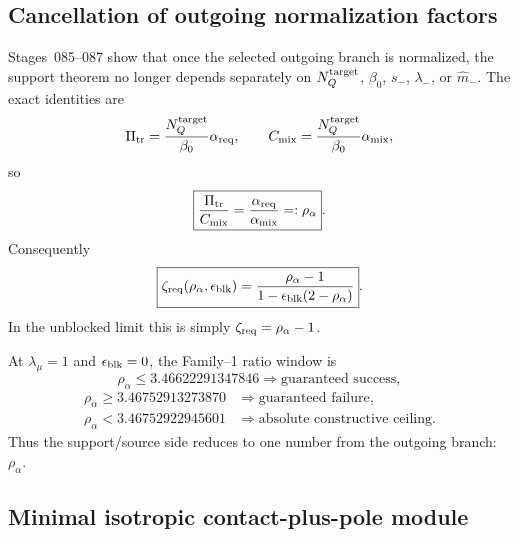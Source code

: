 \subsection{Cancellation of outgoing normalization factors}
\label{subsec:part03-normalization-cancellation}

Stages~085--087 show that once the selected outgoing branch is normalized, the support theorem no longer depends separately on \(N_Q^{\rm target}\), \(\beta_0\), \(s_-\), \(\lambda_-\), or \(\widehat m_-\).  The exact identities are
\begin{equation}
\label{eq:part03-Pi-Cmix-alpha}
\Pi_{\rm tr}=\frac{N_Q^{\rm target}}{\beta_0}\alpha_{\rm req},
\qquad
C_{\rm mix}=\frac{N_Q^{\rm target}}{\beta_0}\alpha_{\rm mix},
\end{equation}
so
\begin{equation}
\label{eq:part03-rhoalpha-def}
\boxed{
\frac{\Pi_{\rm tr}}{C_{\rm mix}}=\frac{\alpha_{\rm req}}{\alpha_{\rm mix}}=:\rho_\alpha}.
\end{equation}
Consequently
\begin{equation}
\label{eq:part03-zeta-rhoalpha}
\boxed{
\zeta_{\rm req}(\rho_\alpha,
\epsilon_{\rm blk})=
\frac{\rho_\alpha-1}{1-
\epsilon_{\rm blk}(2-
\rho_\alpha)}}.
\end{equation}
In the unblocked limit this is simply \(\zeta_{\rm req}=\rho_\alpha-1\).

At \(\lambda_\mu=1\) and \(\epsilon_{\rm blk}=0\), the Family--1 ratio window is
\begin{equation}
\label{eq:part03-rho-window}
\rho_\alpha\leq3.46622291347846\Rightarrow\text{guaranteed success},
\end{equation}
\begin{equation}
\label{eq:part03-rho-window-fail}
\begin{aligned}
\rho_\alpha\geq3.46752913273870
&\Rightarrow
\text{guaranteed failure},\\
\rho_\alpha<3.46752922945601
&\Rightarrow
\text{absolute constructive ceiling}.
\end{aligned}
\end{equation}
Thus the support/source side reduces to one number from the outgoing branch: \(\rho_\alpha\).

\subsection{Minimal isotropic contact-plus-pole module}
\label{subsec:part03-minimal-module}

